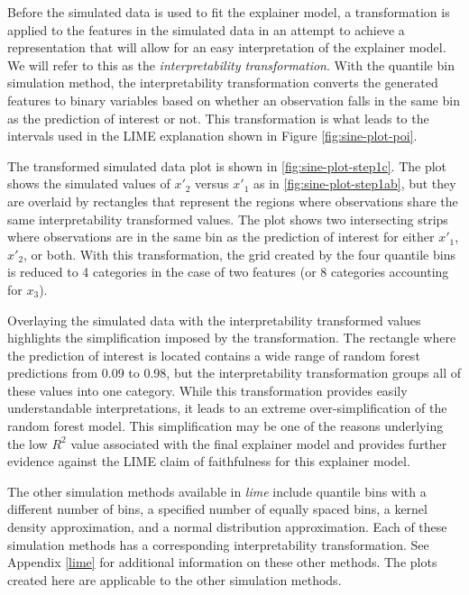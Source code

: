 \documentclass[AMS,STIX2COL]{WileyNJD-v2}\usepackage[]{graphicx}\usepackage[]{color}
\begin{document}
{Before the simulated data is used to fit the explainer model, a transformation is applied to the features in the simulated data in an attempt to achieve a representation that will allow for an easy interpretation of the explainer model. We will refer to this as the \emph{interpretability transformation}. With the quantile bin simulation method, the interpretability transformation converts the generated features to binary variables based on whether an observation falls in the same bin as the prediction of interest or not. This transformation is what leads to the intervals used in the LIME explanation shown in Figure \ref{fig:sine-plot-poi}.

The transformed simulated data plot is shown in \autoref{fig:sine-plot-step1c}. The plot shows the simulated values of $x'_2$ versus $x'_1$ as in \autoref{fig:sine-plot-step1ab}, but they are overlaid by rectangles that represent the regions where observations share the same interpretability transformed values. The plot shows two intersecting strips where observations are in the same bin as the prediction of interest for either $x'_1$, $x'_2$, or both. With this transformation, the grid created by the four quantile bins is reduced to 4 categories in the case of two features (or 8 categories accounting for $x_3$).

Overlaying the simulated data with the interpretability transformed values highlights the simplification imposed by the transformation. The rectangle where the prediction of interest is located contains a wide range of random forest predictions from 0.09 to 0.98, but the interpretability transformation groups all of these values into one category. While this transformation  provides easily understandable interpretations, it leads to an extreme over-simplification of the random forest model. This simplification may be one of the reasons underlying the low $R^2$ value associated with the final explainer model and provides further evidence against the LIME claim of faithfulness for this explainer model.

The other simulation methods available in \emph{lime} include quantile bins with a different number of bins, a specified number of equally spaced bins, a kernel density approximation, and a normal distribution approximation. Each of these simulation methods has a corresponding interpretability transformation. See Appendix \ref{lime} for additional information on these other methods. The plots created here are applicable to the other simulation methods.

}
\end{document}
